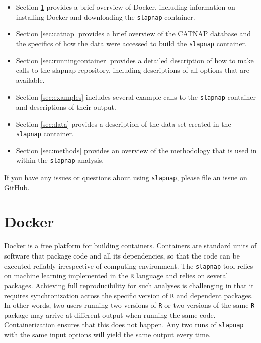 \documentclass[]{article}
\providecommand{\tightlist}{%
  \setlength{\itemsep}{0pt}\setlength{\parskip}{0pt}}
\begin{document}
\begin{itemize}
\tightlist
\item
  Section \ref{sec:docker} provides a brief overview of Docker,
  including information on installing Docker and downloading the
  \texttt{slapnap} container.
\item
  Section \ref{sec:catnap} provides a brief overview of the CATNAP
  database and the specifics of how the data were accessed to build the
  \texttt{slapnap} container.
\item
  Section \ref{sec:runningcontainer} provides a detailed description of
  how to make calls to the slapnap repository, including descriptions of
  all options that are available.
\item
  Section \ref{sec:examples} includes several example calls to the
  \texttt{slapnap} container and descriptions of their output.
\item
  Section \ref{sec:data} provides a description of the data set created
  in the \texttt{slapnap} container.
\item
  Section \ref{sec:methods} provides an overview of the methodology that
  is used in within the \texttt{slapnap} analysis.
\end{itemize}

If you have any issues or questions about using \texttt{slapnap}, please
\href{https://github.com/benkeser/slapnap/issues}{file an issue} on
GitHub.

\section{Docker}\label{sec:docker}

Docker is a free platform for building containers. Containers are
standard units of software that package code and all its dependencies,
so that the code can be executed reliably irrespective of computing
environment. The \texttt{slapnap} tool relies on machine learning
implemented in the \texttt{R} language and relies on several packages.
Achieving full reproducibility for such analyses is challenging in that
it requires synchronization across the specific version of \texttt{R}
and dependent packages. In other words, two users running two versions
of \texttt{R} or two versions of the same \texttt{R} package may arrive
at different output when running the same code. Containerization ensures
that this does not happen. Any two runs of \texttt{slapnap} with the
same input options will yield the same output every time.
\end{document}
